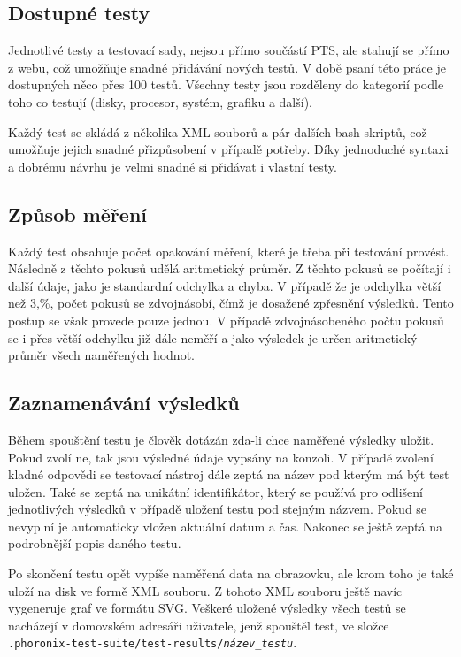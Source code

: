 \subsection{Dostupné testy}
Jednotlivé testy a testovací sady, nejsou přímo součástí PTS, ale stahují se přímo z webu, což umožňuje snadné přidávání nových testů. V době psaní této práce je dostupných něco přes 100 testů. Všechny testy jsou rozděleny do kategorií podle toho co testují (disky, procesor, systém, grafiku a další).

Každý test se skládá z několika XML souborů a pár dalších bash skriptů, což umožňuje jejich snadné přizpůsobení v případě potřeby. Díky jednoduché syntaxi a dobrému návrhu je velmi snadné si přidávat i vlastní testy.

\subsection{Způsob měření}
Každý test obsahuje počet opakování měření, které je třeba při testování provést. Následně z těchto pokusů udělá aritmetický průměr. Z těchto pokusů se počítají i další údaje, jako je standardní odchylka a chyba. V případě že je odchylka větší než 3,\%, počet pokusů se zdvojnásobí, čímž je dosažené zpřesnění výsledků. Tento postup se však provede pouze jednou. V případě zdvojnásobeného počtu pokusů se i přes větší odchylku již dále neměří a jako výsledek je určen aritmetický průměr všech naměřených hodnot.

\subsection{Zaznamenávání výsledků}
Během spouštění testu je člověk dotázán zda-li chce naměřené výsledky uložit. Pokud zvolí ne, tak jsou výsledné údaje vypsány na konzoli. V případě zvolení kladné odpovědi se testovací nástroj dále zeptá na název pod kterým má být test uložen. Také se zeptá na unikátní identifikátor, který se používá pro odlišení jednotlivých výsledků v případě uložení testu pod stejným názvem. Pokud se nevyplní je automaticky vložen aktuální datum a čas. Nakonec se ještě zeptá na podrobnější popis daného testu.

Po skončení testu opět vypíše naměřená data na obrazovku, ale krom toho je také uloží na disk ve formě XML souboru. Z tohoto XML souboru ještě navíc vygeneruje graf ve formátu SVG. Veškeré uložené výsledky všech testů se nacházejí v domovském adresáři uživatele, jenž spouštěl test, ve složce \texttt{.phoronix-test-suite/test-results/\textit{název\_testu}}.

